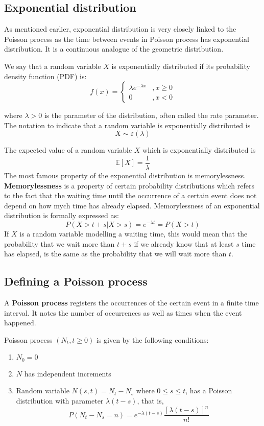 \documentclass[times, utf8, diplomski]{fer}
\begin{document}
		\subsection{Exponential distribution}
		As mentioned earlier, exponential distribution is very closely linked to the Poisson process as the time between events in Poisson process has exponential distribution. It is a continuous analogue of the geometric distribution.
			\begin{definition}
			\label{exponential}
			We say that a random variable $X$ is exponentially distributed if its probability density function (PDF) is:
			$$
				f(x) = \left\{ \begin{array}{lc} \lambda e^{-\lambda x} &, x \geq 0 \\
												0 &, x < 0 \end{array}\right.
			$$

			\noindent where $\lambda > 0$ is the parameter of the distribution, often called the rate parameter. The notation to indicate that a random variable is exponentially distributed is $$X \sim \varepsilon(\lambda)$$
			\end{definition}

			\noindent The expected value of a random variable $X$ which is exponentially distributed is $$\mathbb{E}[X] = \frac{1}{\lambda}$$ The most famous property of the exponential distribution is memorylessness. \textbf{Memorylessness} is a property of certain probability distributions which refers to the fact that the waiting time until the occurrence of a certain event does not depend on how mych time has already elapsed. Memorylessness of an exponential distribution is formally expressed as: $$P(X > t + s | X>s) = e^{-\lambda t} = P(X > t)$$ If $X$ is a random variable modelling a waiting time, this would mean that the probability that we wait more than $t+s$ if we already know that at least $s$ time has elapsed, is the same as the probability that we will wait more than $t$. 
		\subsection{Defining a Poisson process}
		A \textbf{Poisson process} registers the occurrences of the certain event in a finite time interval. It notes the number of occurrences as well as times when the event happened. 
		\begin{definition}
			Poisson process $(N_t, t \geq 0)$ is given by the following conditions:
			\begin{enumerate}
				\item $N_0 = 0$
				\item $N$ has independent increments
				\item Random variable $N(s,t) = N_t - N_s$ where $0 \leq s \leq t$, has a Poisson distribution with parameter $\lambda (t-s)$, that is, $$ P(N_t - N_s = n) = e^{-\lambda(t-s)}\frac{[\lambda(t-s)]^n}{n!} $$
			\end{enumerate}
		\end{definition}
\end{document}
